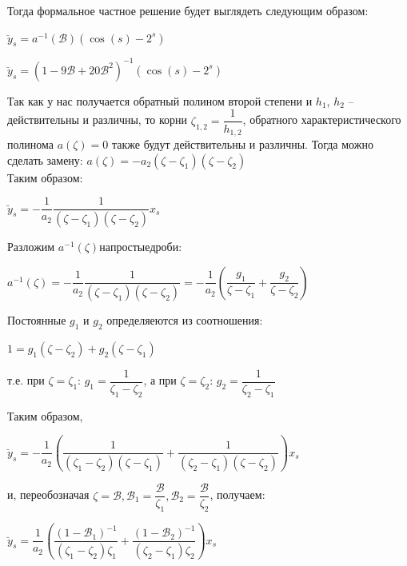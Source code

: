 \documentclass[14pt,fleqn]{extarticle}
\begin{document}
	Тогда формальное частное решение будет выглядеть следующим образом:
	\begin{center}
		$\breve{y}_s = a^{-1}(\mathcal{B}) (\cos(s) - 2^s)$
	\end{center}
	\newpage
	\begin{center}
		$\breve{y}_s = (1 - 9\mathcal{B} + 20\mathcal{B}^2)^{-1} (\cos(s) - 2^s)$
	\end{center}
	Так как у нас получается обратный полином второй степени и $h_1$, $h_2$ -- действительны и различны, то корни $\zeta_{1,2} = \dfrac{1}{h_{1,2}}$, обратного характеристического полинома $a(\zeta) = 0$ также будут действительны и различны.
	Тогда можно сделать замену: $a(\zeta) = -a_2(\zeta-\zeta_1)(\zeta-\zeta_2)$\\
	Таким образом:
	\begin{center}
		$\breve{y}_s = -\dfrac{1}{a_2} \dfrac{1}{(\zeta-\zeta_1)(\zeta-\zeta_2)} x_s$
	\end{center}
	Разложим $a^{-1}(\zeta) на простые дроби:$\\
	\begin{center}
		$a^{-1}(\zeta) = -\dfrac{1}{a_2} \dfrac{1}{(\zeta-\zeta_1)(\zeta-\zeta_2)} = -\dfrac{1}{a_2} \left(\dfrac{g_1}{\zeta-\zeta_1} + \dfrac{g_2}{\zeta-\zeta_2}\right)$
	\end{center}
	Постоянные $g_1$ и $g_2$ определяеются из соотношения:
	\begin{center}
		$1 = g_1(\zeta-\zeta_2) + g_2(\zeta-\zeta_1)$
	\end{center}
	т.е. при $\zeta = \zeta_1$: $g_1 = \dfrac{1}{\zeta_1-\zeta_2}$, а при $\zeta = \zeta_2$: $g_2 = \dfrac{1}{\zeta_2-\zeta_1}$
	
	Таким образом,
	\begin{center}
		$\breve{y}_s = -\dfrac{1}{a_2} \left(\dfrac{1}{(\zeta_1-\zeta_2)(\zeta-\zeta_1)} + \dfrac{1}{(\zeta_2-\zeta_1)(\zeta-\zeta_2)}\right) x_s$
	\end{center}
	и, переобозначая $\zeta = \mathcal{B}, \mathcal{B}_1 = \dfrac{\mathcal{B}}{\zeta_1}, \mathcal{B}_2 = \dfrac{\mathcal{B}}{\zeta_2}$, получаем:
	\begin{center}
		$\breve{y}_s = \dfrac{1}{a_2} \left(\dfrac{(1-\mathcal{B}_1)^{-1}}{(\zeta_1-\zeta_2)\zeta_1}+\dfrac{(1-\mathcal{B}_2)^{-1}}{(\zeta_2-\zeta_1)\zeta_2}\right) x_s$
	\end{center}
\end{document}
